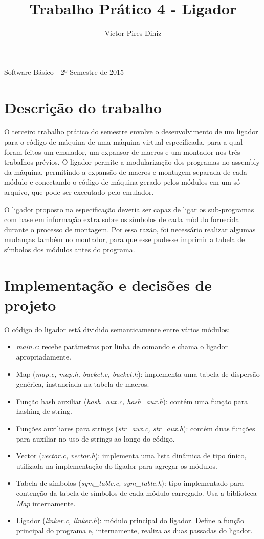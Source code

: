 \documentclass[12pt,a4paper]{article}
\title{Trabalho Prático 4 - Ligador}
\author{Victor Pires Diniz}
\numberwithin{equation}{section}
\begin{document}
\maketitle
\begin{center}
Software Básico - 2º Semestre de 2015
\end{center}

\section{Descrição do trabalho}

O terceiro trabalho prático do semestre envolve o desenvolvimento de um ligador para o código de máquina de uma máquina virtual especificada, para a qual foram feitos um emulador, um expansor de macros e um montador nos três trabalhos prévios. O ligador permite a modularização dos programas no assembly da máquina, permitindo a expansão de macros e montagem separada de cada módulo e conectando o código de máquina gerado pelos módulos em um só arquivo, que pode ser executado pelo emulador.

O ligador proposto na especificação deveria ser capaz de ligar os sub-programas com base em informação extra sobre os símbolos de cada módulo fornecida durante o processo de montagem. Por essa razão, foi necessário realizar algumas mudanças também no montador, para que esse pudesse imprimir a tabela de símbolos dos módulos antes do programa.

\section{Implementação e decisões de projeto}

O código do ligador está dividido semanticamente entre vários módulos:

\begin{itemize}
    \item \emph{main.c}: recebe parâmetros por linha de comando e chama o ligador apropriadamente.
    \item Map (\emph{map.c, map.h, bucket.c, bucket.h}): implementa uma tabela de dispersão genérica, instanciada na tabela de macros.
    \item Função hash auxiliar (\emph{hash\_aux.c, hash\_aux.h}): contém uma função para hashing de string.
    \item Funções auxiliares para strings (\emph{str\_aux.c, str\_aux.h}): contém duas funções para auxiliar no uso de strings ao longo do código.
    \item Vector (\emph{vector.c, vector.h}): implementa uma lista dinâmica de tipo único, utilizada na implementação do ligador para agregar os módulos.
    \item Tabela de símbolos (\emph{sym\_table.c, sym\_table.h}): tipo implementado para contenção da tabela de símbolos de cada módulo carregado. Usa a biblioteca \emph{Map} internamente.
    \item Ligador (\emph{linker.c, linker.h}): módulo principal do ligador. Define a função principal do programa e, internamente, realiza as duas passadas do ligador.
\end{itemize}
\end{document}
